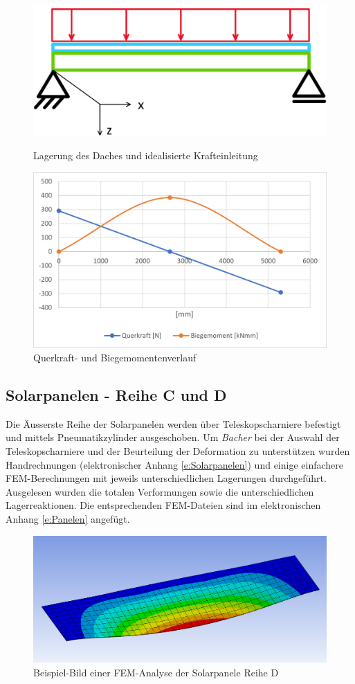 \begin{figure}[h]
\centering
\begin{minipage}{.4\textwidth}
  \centering
  \includegraphics[width=.98\linewidth]{04_figures/Dach Idealisierung.png}
  \caption{Lagerung des Daches und idealisierte Krafteinleitung}
  \label{Dach Idealisierung}
\end{minipage}%
\begin{minipage}{.6\textwidth}
  \centering
  \includegraphics[width=.98\linewidth]{04_figures/Dach QM.png}
  \caption{Querkraft- und Biegemomentenverlauf}
  \label{Dach QM}
\end{minipage}
\end{figure}


\subsection{Solarpanelen - Reihe C und D}
Die Äusserste Reihe der Solarpanelen werden über Teleskopscharniere befestigt und mittels Pneumatikzylinder ausgeschoben. Um \emph{Bacher} bei der Auswahl der Teleskopscharniere und der Beurteilung der Deformation zu unterstützen wurden Handrechnungen (elektronischer Anhang \ref{e:Solarpanelen}) und einige einfachere FEM-Berechnungen mit jeweils unterschiedlichen Lagerungen durchgeführt. Ausgelesen wurden die totalen Verformungen sowie die unterschiedlichen Lagerreaktionen. Die entsprechenden FEM-Dateien sind im elektronischen Anhang \ref{e:Panelen} angefügt.

\begin{figure}[h]
  \centering
  \includegraphics[width=.6\linewidth]{04_figures/Panelen Verformung.png}
  \caption{Beispiel-Bild einer FEM-Analyse der Solarpanele Reihe D}
  \label{Panelen Verformung}
\end{figure}
\newpage
